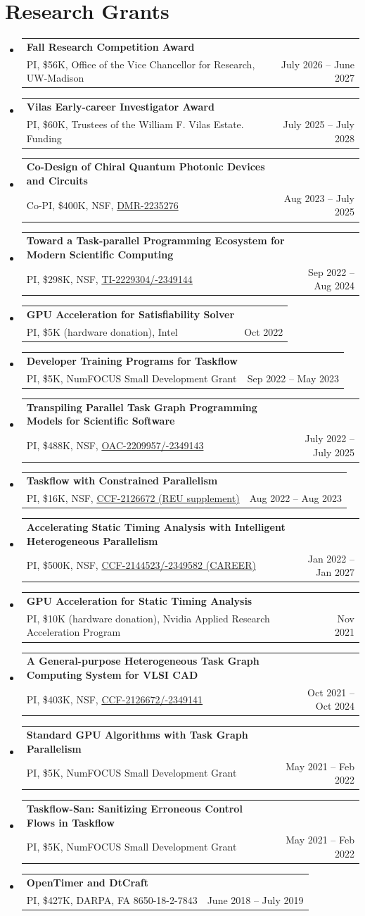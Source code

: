 \documentclass[A4,11pt]{article}
\makeatletter
\newcommand{\CVItem}[1]{
  \item\small{
    {#1 \vspace{-2pt}}
  }
}
\newcommand{\CVSubheading}[4]{
  \vspace{-2pt}\item
    \begin{tabular*}{0.97\textwidth}[t]{l@{\extracolsep{\fill}}r}
      \textbf{#1} & #2 \\
      \small#3 & \small #4 \\
    \end{tabular*}\vspace{-7pt}
}
\newcommand{\CVSubHeadingListStart}{\begin{itemize}[leftmargin=0.5cm, label={}]}
\newcommand{\CVSubHeadingListEnd}{\end{itemize}}
\newcommand{\CVItemListStart}{\begin{itemize}}
\newcommand{\CVItemListEnd}{\end{itemize}\vspace{-5pt}}
\makeatother
\begin{document}

\section{Research Grants}
  \CVSubHeadingListStart
    \CVSubheading
      {{Fall Research Competition Award}}{}
      {PI, \$56K, Office of the Vice Chancellor for Research, UW-Madison}{July 2026 -- June 2027}
    \CVSubheading
      {{Vilas Early-career Investigator Award}}{}
      {PI, \$60K, Trustees of the William F. Vilas Estate. Funding}{July 2025 -- July 2028}
    \CVSubheading
      {{Co-Design of Chiral Quantum Photonic Devices and Circuits}}{}
      {Co-PI, \$400K, NSF, \href{https://www.nsf.gov/awardsearch/showAward?AWD_ID=2235276}{DMR-2235276}}{Aug 2023 -- July 2025}
    \CVSubheading
      {{Toward a Task-parallel Programming Ecosystem for Modern Scientific Computing}}{}
      {PI, \$298K, NSF, \href{https://www.nsf.gov/awardsearch/showAward?AWD_ID=2349144}{TI-2229304/-2349144}}{Sep 2022 -- Aug 2024}
    \CVSubheading
      {{GPU Acceleration for Satisfiability Solver}}{}
      {PI, \$5K (hardware donation), Intel}{Oct 2022}
    \CVSubheading
      {{Developer Training Programs for Taskflow}}{}
      {PI, \$5K, NumFOCUS Small Development Grant}{Sep 2022 -- May 2023}
    \CVSubheading
      {{Transpiling Parallel Task Graph Programming Models for Scientific Software}}{}
      {PI, \$488K, NSF, \href{https://www.nsf.gov/awardsearch/showAward?AWD_ID=2349143}{OAC-2209957/-2349143}}{July 2022 -- July 2025}
    \CVSubheading
      {{Taskflow with Constrained Parallelism}}{}
      {PI, \$16K, NSF, \href{https://www.nsf.gov/awardsearch/showAward?AWD_ID=2126672}{CCF-2126672 (REU supplement)}}{Aug 2022 -- Aug 2023}
    \CVSubheading
      {{Accelerating Static Timing Analysis with Intelligent Heterogeneous Parallelism}}{}
      {PI, \$500K, NSF, \href{https://www.nsf.gov/awardsearch/showAward?AWD_ID=2349582}{CCF-2144523/-2349582 (CAREER)}}{Jan 2022 -- Jan 2027}
    \CVSubheading
      {{GPU Acceleration for Static Timing Analysis}}{}
      {PI, \$10K (hardware donation), Nvidia Applied Research Acceleration Program}{Nov 2021}
    \CVSubheading
      {{A General-purpose Heterogeneous Task Graph Computing System for VLSI CAD}}{}
      {PI, \$403K, NSF, \href{https://www.nsf.gov/awardsearch/showAward?AWD_ID=2349141}{CCF-2126672/-2349141}}{Oct 2021 -- Oct 2024}
    \CVSubheading
      {{Standard GPU Algorithms with Task Graph Parallelism}}{}
      {PI, \$5K, NumFOCUS Small Development Grant}{May 2021 -- Feb 2022}
    \CVSubheading
      {{Taskflow-San: Sanitizing Erroneous Control Flows in Taskflow}}{}
      {PI, \$5K, NumFOCUS Small Development Grant}{May 2021 -- Feb 2022}
    \CVSubheading
      {{OpenTimer and DtCraft}}{}
      {PI, \$427K, DARPA, FA 8650-18-2-7843}{June 2018 -- July 2019}
  \CVSubHeadingListEnd
\end{document}
